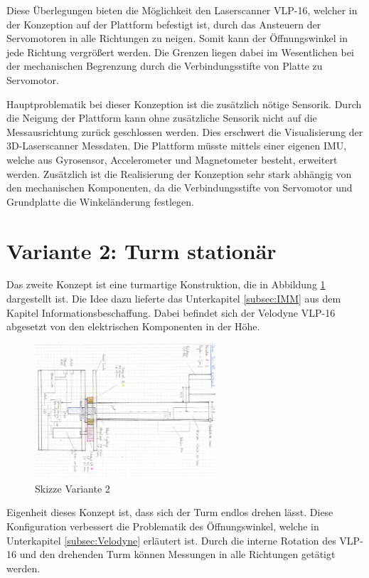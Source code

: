  Diese Überlegungen bieten die Möglichkeit den Laserscanner VLP-16, welcher in der Konzeption auf der Plattform befestigt ist, durch das Ansteuern der Servomotoren in alle Richtungen zu neigen. Somit kann der Öffnungswinkel in jede Richtung vergrößert werden. Die Grenzen liegen dabei im Wesentlichen bei der mechanischen Begrenzung durch die Verbindungsstifte von Platte zu Servomotor.
 
 Hauptproblematik bei dieser Konzeption ist die zusätzlich nötige Sensorik. Durch die Neigung der Plattform kann ohne zusätzliche Sensorik nicht auf die Messausrichtung zurück geschlossen werden. Dies erschwert die Visualisierung der 3D-Laserscanner Messdaten. Die Plattform müsste mittels einer eigenen \ac{IMU}, welche aus Gyrosensor, Accelerometer und Magnetometer besteht, erweitert werden. Zusätzlich ist die Realisierung der Konzeption sehr stark abhängig von den mechanischen Komponenten, da die Verbindungsstifte von Servomotor und Grundplatte die Winkeländerung festlegen.
 

\section {Variante 2: Turm stationär}
\label{sec:var2}
Das zweite Konzept ist eine turmartige Konstruktion, die in Abbildung \ref{fig:skizze_unrotierend} dargestellt ist. Die Idee dazu lieferte das Unterkapitel \ref{subsec:IMM} aus dem Kapitel Informationsbeschaffung. Dabei befindet sich der Velodyne VLP-16 abgesetzt von den elektrischen Komponenten in der Höhe.

\begin{figure}[H]
	\centering
	\includegraphics[angle=90,width=0.6\textwidth]{resources/skizze_unrotierend.PNG}
	\caption[Skizze Varainte 2]{Skizze Variante 2 }
	\label{fig:skizze_unrotierend}
\end{figure} 

Eigenheit dieses Konzept ist, dass sich der Turm endlos drehen lässt. Diese Konfiguration verbessert die Problematik des Öffnungswinkel, welche in Unterkapitel \ref{subsec:Velodyne} erläutert ist. Durch die interne Rotation des VLP-16 und den drehenden Turm können Messungen in alle Richtungen getätigt werden. 

